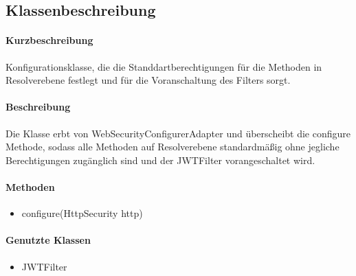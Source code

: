 \subsection*{Klassenbeschreibung}%
\paragraph*{Kurzbeschreibung}
Konfigurationsklasse, die die Standdartberechtigungen für die Methoden in Resolverebene festlegt und für die Voranschaltung des Filters sorgt.
\paragraph*{Beschreibung}
Die Klasse erbt von \dq WebSecurityConfigurerAdapter \dq und überscheibt die \dq configure \dq Methode, sodass 
alle Methoden auf Resolverebene standardmäßig ohne jegliche Berechtigungen zugänglich sind und der JWTFilter vorangeschaltet wird.
\paragraph*{Methoden}
\begin{itemize}
	\item configure(HttpSecurity http)
\end{itemize}	
\paragraph*{Genutzte Klassen}
\begin{itemize}
	\item JWTFilter
\end{itemize}	